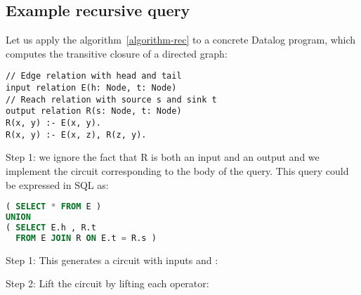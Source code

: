 \subsection{Example recursive query}\label{sec:recursive-example}

Let us apply the algorithm~\ref{algorithm-rec} to a concrete Datalog
program, which computes the transitive closure of a directed graph:

\begin{lstlisting}[language=ddlog,basicstyle=\small\ttfamily]
// Edge relation with head and tail
input relation E(h: Node, t: Node)
// Reach relation with source s and sink t
output relation R(s: Node, t: Node)
R(x, y) :- E(x, y).
R(x, y) :- E(x, z), R(z, y).
\end{lstlisting}

Step 1: we ignore the fact that R is both an input and an output and we implement
the \dbsp circuit corresponding to the body of the query.  This query could be expressed
in SQL as:

\begin{lstlisting}[language=SQL,basicstyle=\small\ttfamily]
( SELECT * FROM E )
UNION
( SELECT E.h , R.t
  FROM E JOIN R ON E.t = R.s )
\end{lstlisting}

\noindent Step 1:
This generates a circuit with inputs  and :


\noindent Step 2: Lift the circuit by lifting each operator:


